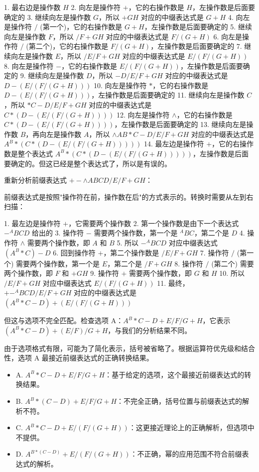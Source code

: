 \documentclass[lang=cn,newtx,10pt,scheme=chinese]{../../../elegantbook}
\begin{document}
\begin{enumerate}
    1. 最右边是操作数 $H$
    2. 向左是操作符 $+$，它的右操作数是 $H$，左操作数是后面要确定的
    3. 继续向左是操作数 $G$，所以 $+ GH$ 对应的中缀表达式是 $G+H$
    4. 向左是操作符 $/$ (第一个)，它的右操作数是 $G+H$，左操作数是后面要确定的
    5. 继续向左是操作数 $F$，所以 $/F + GH$ 对应的中缀表达式是 $F/(G+H)$
    6. 向左是操作符 $/$ (第二个)，它的右操作数是 $F/(G+H)$，左操作数是后面要确定的
    7. 继续向左是操作数 $E$，所以 $/E/F + GH$ 对应的中缀表达式是 $E/(F/(G+H))$
    8. 向左是操作符 $-$，它的右操作数是 $E/(F/(G+H))$，左操作数是后面要确定的
    9. 继续向左是操作数 $D$，所以 $-D/E/F + GH$ 对应的中缀表达式是 $D-(E/(F/(G+H)))$
    10. 向左是操作符 $*$，它的右操作数是 $D-(E/(F/(G+H)))$，左操作数是后面要确定的
    11. 继续向左是操作数 $C$，所以 $*C-D/E/F + GH$ 对应的中缀表达式是 $C*(D-(E/(F/(G+H))))$
    12. 向左是操作符 $\wedge$，它的右操作数是 $C*(D-(E/(F/(G+H))))$，左操作数是后面要确定的
    13. 继续向左是操作数 $B$，再向左是操作数 $A$，所以 $\wedge AB*C-D/E/F + GH$ 对应的中缀表达式是 $A^{B}*(C*(D-(E/(F/(G+H)))))$
    14. 最左边是操作符 $+$，它的右操作数是整个表达式 $A^{B}*(C*(D-(E/(F/(G+H)))))$，左操作数是后面要确定的。但这已经是整个表达式了，所以是有误的。

    重新分析前缀表达式 $+- \wedge ABCD/E/F + GH$：

    前缀表达式是按照"操作符在前，操作数在后"的方式表示的。转换时需要从左到右扫描：

    1. 最左边是操作符 $+$，它需要两个操作数
    2. 第一个操作数是由下一个表达式 $- ^ABCD$ 给出的
    3. 操作符 $-$ 需要两个操作数，第一个是 $^ABC$，第二个是 $D$
    4. 操作符 $\wedge$ 需要两个操作数，即 $A$ 和 $B$
    5. 所以 $- ^ABCD$ 对应中缀表达式 $(A^B*C)-D$
    6. 回到操作符 $+$，第二个操作数是 $/E/F + GH$
    7. 操作符 $/$ (第一个) 需要两个操作数，第一个是 $E$，第二个是 $/F + GH$
    8. 操作符 $/$ (第二个) 需要两个操作数，即 $F$ 和 $+ GH$
    9. 操作符 $+$ 需要两个操作数，即 $G$ 和 $H$
    10. 所以 $/E/F + GH$ 对应中缀表达式 $E/(F/(G+H))$
    11. 最终，$+- ^ABCD/E/F + GH$ 对应的中缀表达式是 $(A^B*C-D)+(E/(F/(G+H)))$

    但这与选项不完全匹配。检查选项 A：$A^B*C-D+E/F/G+H$，它表示 $(A^B*C-D)+(E/F)/G+H$，与我们的分析结果不同。

    由于选项格式有限，可能为了简化表示，括号被省略了。根据运算符优先级和结合性，选项 A 最接近前缀表达式的正确转换结果。

    \begin{itemize}
        \item A. $A^B*C-D+E/F/G+H$：基于给定的选项，这个最接近前缀表达式的转换结果。
        \item B. $A^B*(C-D) + E/F/G + H$：不完全正确，括号位置与前缀表达式的解析不符。
        \item C. $A^B*C-D+E/(F/(G+H))$：这更接近理论上的正确解析，但选项中不提供。
        \item D. $A^{B*(C-D)} +E/(F/(G+H))$：不正确，幂的应用范围不符合前缀表达式的解析。
    \end{itemize}


\end{enumerate}
\end{document}
